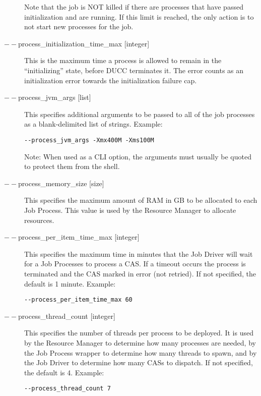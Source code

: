 \begin{description}
             Note that the job is NOT killed if there are processes that have passed initialization and are 
             running. If this limit is reached, the only action is to not start new processes for the job. 

           \item[$--$process\_initialization\_time\_max {[integer]}] This is the maximum time a process
             is allowed to remain in the ``initializing'' state, before DUCC terminates it.  The error
             counts as an initialization error towards the initialization failure cap.

           \item[$--$process\_jvm\_args {[list]} ] This specifies additional arguments to be passed to
             all of the job processes as a blank-delimited list of strings. Example:
             \begin{verbatim}
--process_jvm_args -Xmx400M -Xms100M
             \end{verbatim}

             Note: When used as a CLI option, the arguments must usually be
             quoted to protect them from the shell.
                          
           \item[$--$process\_memory\_size {[size]} ] This specifies the maximum amount of RAM in GB
             to be allocated to each Job Process.  This value is used by the Resource Manager to
             allocate resources.

           \item[$--$process\_per\_item\_time\_max {[integer]} ] This specifies the maximum time in
             minutes that the Job Driver will wait for a Job Processes to process a CAS. If a
             timeout occurs the process is terminated and the CAS marked in error (not retried). If
             not specified, the default is 1 minute. Example:
             \begin{verbatim}
--process_per_item_time_max 60 
             \end{verbatim}
             
           \item[$--$process\_thread\_count {[integer]} ] This specifies the number of threads per
             process to be deployed. It is used by the Resource Manager to determine how many
             processes are needed, by the Job Process wrapper to determine how many threads to
             spawn, and by the Job Driver to determine how many CASs to dispatch. If not specified,
             the default is 4. Example:
             \begin{verbatim}
--process_thread_count 7 
             \end{verbatim}
             

\end{description}
